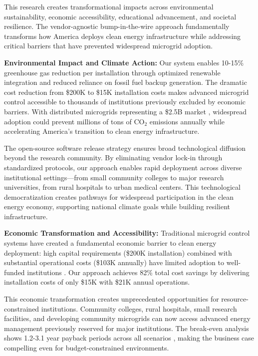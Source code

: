 \documentclass[12pt]{article}
\begin{document}
This research creates transformational impacts across environmental sustainability, economic accessibility, educational advancement, and societal resilience. The vendor-agnostic bump-in-the-wire approach fundamentally transforms how America deploys clean energy infrastructure while addressing critical barriers that have prevented widespread microgrid adoption.

\textbf{Environmental Impact and Climate Action:} Our system enables 10-15\% greenhouse gas reduction per installation through optimized renewable integration and reduced reliance on fossil fuel backup generation. The dramatic cost reduction from \$200K to \$15K installation costs \cite{our2024economic} makes advanced microgrid control accessible to thousands of institutions previously excluded by economic barriers. With distributed microgrids representing a \$2.5B market \cite{our2024economic}, widespread adoption could prevent millions of tons of CO$_2$ emissions annually while accelerating America's transition to clean energy infrastructure.

The open-source software release strategy ensures broad technological diffusion beyond the research community. By eliminating vendor lock-in through standardized protocols, our approach enables rapid deployment across diverse institutional settings—from small community colleges to major research universities, from rural hospitals to urban medical centers. This technological democratization creates pathways for widespread participation in the clean energy economy, supporting national climate goals while building resilient infrastructure.

\textbf{Economic Transformation and Accessibility:} Traditional microgrid control systems have created a fundamental economic barrier to clean energy deployment: high capital requirements (\$200K installation) combined with substantial operational costs (\$103K annually) have limited adoption to well-funded institutions \cite{hirsch2018,sigrin2019}. Our approach achieves 82\% total cost savings \cite{our2024economic} by delivering installation costs of only \$15K with \$21K annual operations.

This economic transformation creates unprecedented opportunities for resource-constrained institutions. Community colleges, rural hospitals, small research facilities, and developing community microgrids can now access advanced energy management previously reserved for major institutions. The break-even analysis shows 1.2-3.1 year payback periods across all scenarios \cite{our2024economic}, making the business case compelling even for budget-constrained environments.
\end{document}
